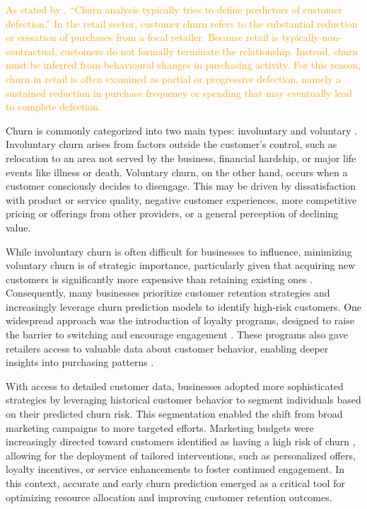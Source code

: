 \textcolor{orange}{As stated by \cite{S37-ID826-Buckinx}, ``Churn analysis typically tries to define predictors of customer defection.'' In the retail sector, customer churn refers to the substantial reduction or cessation of purchases from a focal retailer. Because retail is typically non-contractual, customers do not formally terminate the relationship. Instead, churn must be inferred from behavioural changes in purchasing activity. For this reason, churn in retail is often examined as partial or progressive defection, namely a sustained reduction in purchase frequency or spending that may eventually lead to complete defection.}

Churn is commonly categorized into two main types: involuntary and voluntary \cite{park2022not}. Involuntary churn arises from factors outside the customer’s control, such as relocation to an area not served by the business, financial hardship, or major life events like illness or death. Voluntary churn, on the other hand, occurs when a customer consciously decides to disengage. This may be driven by dissatisfaction with product or service quality, negative customer experiences, more competitive pricing or offerings from other providers, or a general perception of declining value.

While involuntary churn is often difficult for businesses to influence, minimizing voluntary churn is of strategic importance, particularly given that acquiring new customers is significantly more expensive than retaining existing ones \cite{ahmad2001customer}. Consequently, many businesses prioritize customer retention strategies and increasingly leverage churn prediction models to identify high-risk customers. One widespread approach was the introduction of loyalty programs, designed to raise the barrier to switching and encourage engagement \cite{lewis2004influence}. These programs also gave retailers access to valuable data about customer behavior, enabling deeper insights into purchasing patterns \cite{stourm2020refocusing}.

With access to detailed customer data, businesses adopted more sophisticated strategies by leveraging historical customer behavior to segment individuals based on their predicted churn risk. This segmentation enabled the shift from broad marketing campaigns to more targeted efforts. Marketing budgets were increasingly directed toward customers identified as having a high risk of churn \cite{lemmens2020managing}, allowing for the deployment of tailored interventions, such as personalized offers, loyalty incentives, or service enhancements to foster continued engagement. In this context, accurate and early churn prediction emerged as a critical tool for optimizing resource allocation and improving customer retention outcomes.

